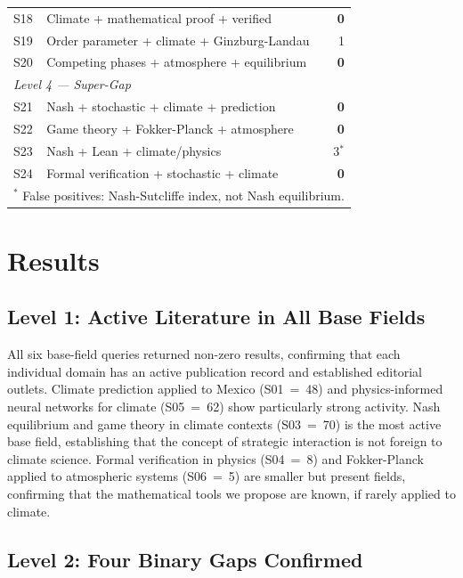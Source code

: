 \documentclass[12pt,a4paper]{article}
\begin{document}
\begin{table}[ht]
\begin{tabular}{llr}
S18 & Climate + mathematical proof + verified         &   \textbf{0} \\
S19 & Order parameter + climate + Ginzburg-Landau     &   1 \\
S20 & Competing phases + atmosphere + equilibrium     &   \textbf{0} \\
\hline
\multicolumn{3}{l}{\textit{Level 4 — Super-Gap}} \\
S21 & Nash + stochastic + climate + prediction        &   \textbf{0} \\
S22 & Game theory + Fokker-Planck + atmosphere        &   \textbf{0} \\
S23 & Nash + Lean + climate/physics                   &   3$^*$ \\
S24 & Formal verification + stochastic + climate      &   \textbf{0} \\
\hline
\multicolumn{3}{l}{$^*$ False positives: Nash-Sutcliffe index,
not Nash equilibrium.} \\
\hline
\end{tabular}
\end{table}

\section{Results}

\subsection{Level 1: Active Literature in All Base Fields}

All six base-field queries returned non-zero results, confirming that
each individual domain has an active publication record and established
editorial outlets. Climate prediction applied to Mexico (S01~=~48)
and physics-informed neural networks for climate (S05~=~62) show
particularly strong activity. Nash equilibrium and game theory in climate
contexts (S03~=~70) is the most active base field, establishing that
the concept of strategic interaction is not foreign to climate science.
Formal verification in physics (S04~=~8) and Fokker-Planck applied to
atmospheric systems (S06~=~5) are smaller but present fields, confirming
that the mathematical tools we propose are known, if rarely applied to
climate.

\subsection{Level 2: Four Binary Gaps Confirmed}
\end{document}

